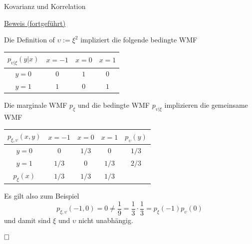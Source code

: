 \documentclass[
  8pt,
  ignorenonframetext,
]{beamer}
\newcommand{\ups}{\upsilon}
\begin{document}
\begin{frame}{Kovarianz und Korrelation}
\protect\hypertarget{kovarianz-und-korrelation-6}{}
\footnotesize

\underline{Beweis (fortgeführt)} \vspace{1mm}

Die Definition of \(\ups := \xi^2\) impliziert die folgende bedingte WMF

\center
\renewcommand{\arraystretch}{1}
\begin{tabular}{c|ccc}
$p_{\ups|\xi}(y|x)$ &   $x = -1$    &   $x = 0$     &   $x = 1$ \\\hline
$y = 0$         &   $0$         &   $1$         &   $0$     \\
$y = 1$         &   $1$         &   $0$         &   $1$     \\
\end{tabular}
\vspace{1mm}

\flushleft

Die marginale WMF \(p_\xi\) und die bedingte WMF \(p_{\ups|\xi}\)
implizieren die gemeinsame WMF

\center
\renewcommand{\arraystretch}{1.1}
\begin{tabular}{c|ccc|c}
$p_{\xi,\ups}(x,y)$ &   $x = -1$    &   $x = 0$     &   $x = 1$ & $p_\ups(y)$       \\\hline
$y = 0$         &   $0$         &   $1/3$       &   $0$     & $1/3$         \\
$y = 1$         &   $1/3$       &   $0$         &   $1/3$   & $2/3$         \\\hline
$p_\xi(x)$      &   $1/3$       &   $1/3$       &   $1/3$
\end{tabular}
\vspace{1mm}

\flushleft

Es gilt also zum Beispiel \begin{equation}
p_{\xi,\ups}(-1,0) = 0 \neq \frac{1}{9} = \frac{1}{3} \cdot \frac{1}{3} = p_{\xi}(-1)p_{\ups}( 0)
\end{equation} und damit sind \(\xi\) und \(\ups\) nicht unabhängig.

\(\hfill\Box\)
\end{frame}
\end{document}
